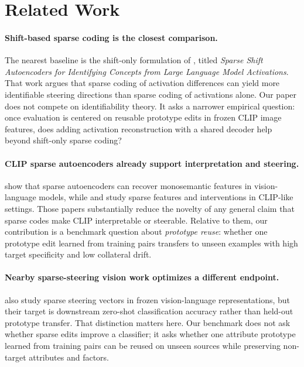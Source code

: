 \documentclass{article}
\begin{document}
\section{Related Work}
\label{sec:related}

\paragraph{Shift-based sparse coding is the closest comparison.}
The nearest baseline is the shift-only formulation of \citet{joshi2025ssae}, titled \emph{Sparse Shift Autoencoders for Identifying Concepts from Large Language Model Activations}. That work argues that sparse coding of activation differences can yield more identifiable steering directions than sparse coding of activations alone. Our paper does not compete on identifiability theory. It asks a narrower empirical question: once evaluation is centered on reusable prototype edits in frozen CLIP image features, does adding activation reconstruction with a shared decoder help beyond shift-only sparse coding?

\paragraph{CLIP sparse autoencoders already support interpretation and steering.}
\citet{pach2025monosemantic} show that sparse autoencoders can recover monosemantic features in vision-language models, while \citet{joseph2025steeringclip} and \citet{zaigrajew2025clip} study sparse features and interventions in CLIP-like settings. Those papers substantially reduce the novelty of any general claim that sparse codes make CLIP interpretable or steerable. Relative to them, our contribution is a benchmark question about \emph{prototype reuse}: whether one prototype edit learned from training pairs transfers to unseen examples with high target specificity and low collateral drift.

\paragraph{Nearby sparse-steering vision work optimizes a different endpoint.}
\citet{chatzoudis2025visualsparsesteering} also study sparse steering vectors in frozen vision-language representations, but their target is downstream zero-shot classification accuracy rather than held-out prototype transfer. That distinction matters here. Our benchmark does not ask whether sparse edits improve a classifier; it asks whether one attribute prototype learned from training pairs can be reused on unseen sources while preserving non-target attributes and factors.
\end{document}
